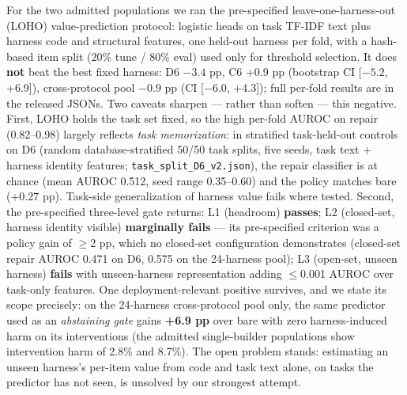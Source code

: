For the two admitted populations we ran the pre-specified
leave-one-harness-out (LOHO) value-prediction protocol: logistic heads on
task TF-IDF text plus harness code and structural features, one held-out
harness per fold, with a hash-based item split (20\% tune / 80\% eval)
used only for threshold selection. It does \textbf{not} beat the best
fixed harness: D6 $-3.4$ pp, C6 +0.9 pp (bootstrap CI {[}$-5.2$, +6.9{]}),
cross-protocol pool $-0.9$ pp (CI {[}$-6.0$, +4.3{]}); full per-fold results
are in the released JSONs. Two caveats sharpen --- rather than soften
--- this negative. First, LOHO holds the task set fixed, so the high
per-fold AUROC on repair (0.82--0.98) largely reflects \emph{task
memorization}: in stratified task-held-out controls on D6 (random
database-stratified 50/50 task splits, five seeds, task text + harness
identity features;   \texttt{task\_split\_D6\_v2.json}), the repair
classifier is at chance (mean AUROC 0.512, seed range 0.35--0.60) and
the policy matches bare (+0.27 pp). Task-side
generalization of harness value fails where tested. Second, the
pre-specified three-level gate returns: L1 (headroom) \textbf{passes};
L2 (closed-set, harness identity visible) \textbf{marginally fails} ---
its pre-specified criterion was a policy gain of $\geq$2 pp, which no
closed-set configuration demonstrates (closed-set repair AUROC 0.471 on
D6, 0.575 on the 24-harness pool); L3 (open-set, unseen harness)
\textbf{fails} with unseen-harness representation adding $\leq$0.001 AUROC
over task-only features. One deployment-relevant positive survives, and
we state its scope precisely: on the 24-harness cross-protocol pool
only, the same predictor used as an \emph{abstaining gate} gains
\textbf{+6.9 pp} over bare with zero harness-induced harm on its
interventions (the admitted single-builder populations show intervention
harm of 2.8\% and 8.7\%). The open problem stands: estimating an unseen
harness's per-item value from code and task text alone, on tasks the
predictor has not seen, is unsolved by our strongest attempt.

